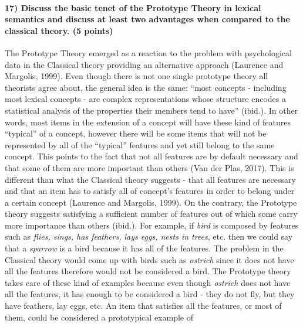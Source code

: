 \documentclass[11pt]{article}
\begin{document}
    \hypertarget{discuss-the-basic-tenet-of-the-prototype-theory-in-lexical-semantics-and-discuss-at-least-two-advantages-when-compared-to-the-classical-theory.-5-points}{%
\paragraph{17) Discuss the basic tenet of the Prototype Theory in
lexical semantics and discuss at least two advantages when compared to
the classical theory. (5
points)}\label{discuss-the-basic-tenet-of-the-prototype-theory-in-lexical-semantics-and-discuss-at-least-two-advantages-when-compared-to-the-classical-theory.-5-points}}

The Prototype Theory emerged as a reaction to the problem with
psychological data in the Classical theory providing an alternative
approach (Laurence and Margolis, 1999). Even though there is not one
single prototype theory all theorists agree about, the general idea is
the same: ``most concepts - including most lexical concepts - are
complex representations whose structure encodes a statistical analysis
of the properties their members tend to have'' (ibid.). In other words,
most items in the extension of a concept will have these kind of
features ``typical'' of a concept, however there will be some items that
will not be represented by all of the ``typical'' features and yet still
belong to the same concept. This points to the fact that not all
features are by default necessary and that some of them are more
important than others (Van der Plas, 2017). This is different than what
the Classical theory suggests - that all features are necessary and that
an item has to satisfy all of concept's features in order to belong
under a certain concept (Laurence and Margolis, 1999). On the contrary,
the Prototype theory suggests satisfying a sufficient number of features
out of which some carry more importance than others (ibid.). For
example, if \emph{bird} is composed by features such as \emph{flies,
sings, has feathers, lays eggs, nests in trees}, etc. then we could say
that a \emph{sparrow} is a bird because it has all of the features. The
problem in the Classical theory would come up with birds such as
\emph{ostrich} since it does not have all the features therefore would
not be considered a bird. The Prototype theory takes care of these kind
of examples because even though \emph{ostrich} does not have all the
features, it has enough to be considered a bird - they do not fly, but
they have feathers, lay eggs, etc. An item that satisfies all the
features, or most of them, could be considered a prototypical example of
\end{document}
